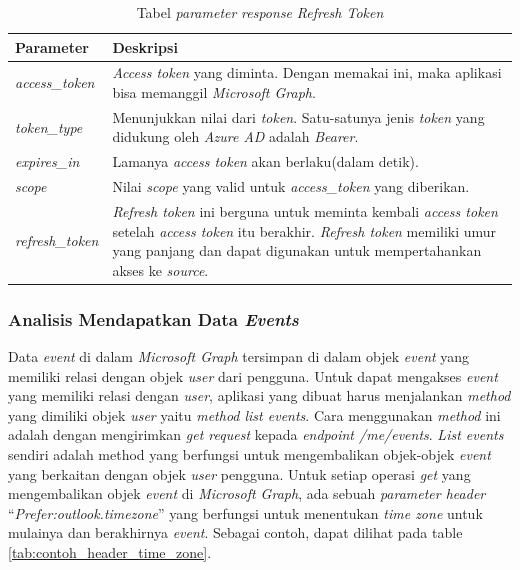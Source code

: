\begin{table}[H]
	\centering 
	\caption{Tabel \textit{parameter} \textit{response} \textit{Refresh Token}}
	\label{tab:parameter_response_refresh_token}
	\begin{tabular}{|p{3cm}|p{9cm}|}
	\toprule
	 \textbf{Parameter} & \textbf{Deskripsi}\\ \hline 
	 \textit{access\_token} & \textit{Access token} yang diminta. Dengan memakai ini, maka aplikasi bisa memanggil \textit{Microsoft Graph}. \\ \hline 
	\textit{token\_type} & Menunjukkan nilai dari \textit{token}. Satu-satunya jenis \textit{token} yang didukung oleh \textit{Azure AD} adalah \textit{Bearer}.\\ \hline 
	\textit{expires\_in} & Lamanya \textit{access token} akan berlaku(dalam detik). \\ \hline 
	\textit{scope} & Nilai \textit{scope} yang valid untuk \textit{access\_token} yang diberikan.  \\ \hline  
	\textit{refresh\_token} & \textit{Refresh token} ini berguna untuk meminta kembali \textit{access token} setelah \textit{access token} itu berakhir. \textit{Refresh token} memiliki umur yang panjang dan dapat digunakan untuk mempertahankan akses ke \textit{source}. \\
	\bottomrule
	\end{tabular}  
\end{table}

\subsubsection{Analisis Mendapatkan Data \textit{Events}}
\label{sec:analisis_mendapatkan_data_events}
Data \textit{event} di dalam \textit{Microsoft Graph} tersimpan di dalam objek \textit{event} yang memiliki relasi dengan objek \textit{user} dari pengguna. Untuk dapat mengakses \textit{event} yang memiliki relasi dengan \textit{user}, aplikasi yang dibuat harus menjalankan \textit{method} yang dimiliki objek \textit{user} yaitu \textit{method list events}. Cara menggunakan \textit{method} ini adalah dengan mengirimkan \textit{get request} kepada \textit{endpoint /me/events}. \textit{List events} sendiri adalah method yang berfungsi untuk mengembalikan objek-objek \textit{event} yang berkaitan dengan objek \textit{user} pengguna. Untuk setiap operasi \textit{get} yang mengembalikan objek \textit{event} di \textit{Microsoft Graph}, ada sebuah \textit{parameter header} ``\textit{Prefer:outlook.timezone}'' yang berfungsi untuk menentukan \textit{time zone} untuk mulainya dan berakhirnya \textit{event}. Sebagai contoh, dapat dilihat pada table \ref{tab:contoh_header_time_zone}. 

